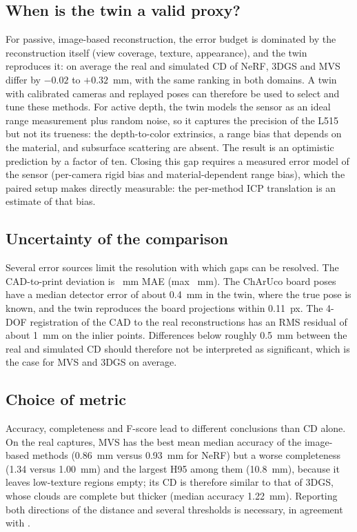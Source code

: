 \subsection{When is the twin a valid proxy?}
For passive, image-based reconstruction, the error budget is dominated by the reconstruction itself
(view coverage, texture, appearance), and the twin reproduces it: on average the real and simulated CD of
NeRF, 3DGS and MVS differ by $-0.02$ to $+0.32$~mm, with the same ranking in both domains. A twin with
calibrated cameras and replayed poses can therefore be used to select and tune these methods. For active
depth, the twin models the sensor as an ideal range measurement plus random noise, so it captures the
precision of the L515 but not its trueness: the depth-to-color extrinsics, a range bias that depends on the
material, and subsurface scattering are absent. The result is an optimistic prediction by a factor of ten.
Closing this gap requires a measured error model of the sensor (per-camera rigid bias and
material-dependent range bias), which the paired setup makes directly measurable: the per-method ICP
translation is an estimate of that bias.

\subsection{Uncertainty of the comparison}
Several error sources limit the resolution with which gaps can be resolved. The CAD-to-print deviation is
\printmae~mm MAE (max \printmax~mm). The ChArUco board poses have a median detector error of about 0.4~mm
in the twin, where the true pose is known, and the twin reproduces the board projections within 0.11~px.
The 4-DOF registration of the CAD to the real reconstructions has an RMS residual of about 1~mm on the
inlier points. Differences below roughly 0.5~mm between the real and simulated CD should therefore not be
interpreted as significant, which is the case for MVS and 3DGS on average.

\subsection{Choice of metric}
Accuracy, completeness and F-score lead to different conclusions than CD alone. On the real captures,
MVS has the best mean median accuracy of the image-based methods (0.86~mm versus 0.93~mm for NeRF) but a
worse completeness (1.34 versus 1.00~mm) and the largest H95 among them (10.8~mm), because it leaves
low-texture regions empty; its CD is therefore similar to that of 3DGS, whose clouds are complete but
thicker (median accuracy 1.22~mm). Reporting both directions of the distance and several thresholds is
necessary, in agreement with \cite{zielinski2026comparative,knapitsch2017tanks}.

